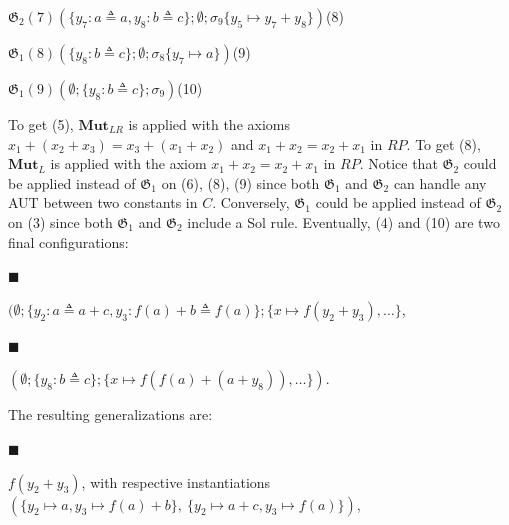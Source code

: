 \par  $\mathfrak{G}_{2}(7)$\quad  $(\{y_{7}:a\triangleq a,y_{8}:b\triangleq c\};\emptyset;\sigma_{9}\{y_{5}\mapsto y_{7}+y_{8}\})$\quad  (8)\quad  
 
\par  $\mathfrak{G}_{1}(8)$\quad  $(\{y_{8}:b\triangleq c\};\emptyset;\sigma_{8}\{y_{7}\mapsto a\})$\quad  (9)\quad  
 
\par  $\mathfrak{G}_{1}(9)$\quad  $(\emptyset;\{y_{8}:b\triangleq c\};\sigma_{9})$\quad  (10)\quad  
   
 
 
To get (5), $\textbf{Mut}_{LR}$ is applied with the axioms $x_{1}+(x_{2}+x_{3})=x_{3}+(x_{1}+x_{2})$ and $x_{1}+x_{2}=x_{2}+x_{1}$ in $RP$. To get (8), $\textbf{Mut}_{L}$ is applied with the axiom $x_{1}+x_{2}=x_{2}+x_{1}$ in $RP$. Notice that $\mathfrak{G}_{2}$ could be applied instead of $\mathfrak{G}_{1}$ on (6), (8), (9) since both $\mathfrak{G}_{1}$ and $\mathfrak{G}_{2}$ can handle any AUT between two constants in $C$. Conversely, $\mathfrak{G}_{1}$ could be applied instead of $\mathfrak{G}_{2}$ on (3) since both $\mathfrak{G}_{1}$ and $\mathfrak{G}_{2}$ include a Sol rule. Eventually, (4) and (10) are two final configurations:\par
  
\par\noindent  $\blacksquare$ 
 
$(\emptyset;\{y_{2}:a\triangleq a+c,y_{3}:f(a)+b\triangleq f(a)\};\{x\mapsto f(y_{2}+y_{3}),\dots\}$,\par
 
 
 
\par\noindent  $\blacksquare$ 
 
$(\emptyset;\{y_{8}:b\triangleq c\};\{x\mapsto f(f(a)+(a+y_{8})),\dots\})$.\par
 
 
  
The resulting generalizations are:\par
  
\par\noindent  $\blacksquare$ 
 
$f(y_{2}+y_{3})$, with respective instantiations $(\{y_{2}\mapsto a,y_{3}\mapsto f(a)+b\},\ \{y_{2}\mapsto a+c,\allowbreak y_{3}\mapsto f(a)\})$,\par
 
